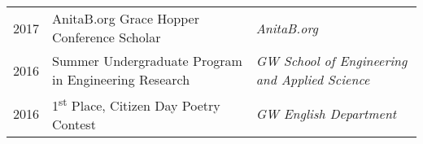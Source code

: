 \documentclass[a4paper,10pt]{article}
\begin{document}
\begin{tabular}{lll}
2017	& AnitaB.org Grace Hopper Conference Scholar  & \textit{AnitaB.org} \\
2016  & Summer Undergraduate Program in Engineering Research	& \textit{GW School of Engineering and Applied Science}\\


2016	 & 1\textsuperscript{st} Place, Citizen Day Poetry Contest & \textit{GW English Department} \\


\end{tabular}



\end{document}
